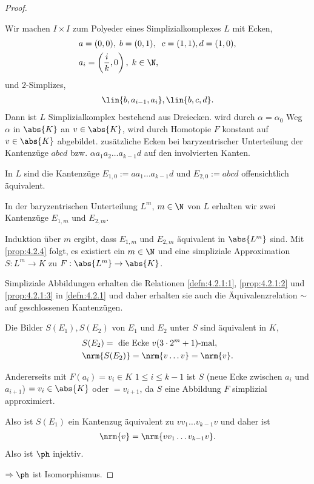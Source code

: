 \begin{proof}
\begin{enumerate}[label=\arabic{*}.)]
Wir machen $I\times I$ zum Polyeder eines Simplizialkomplexes $L$ mit Ecken,
\begin{align*}
&a = (0,0),\; b=(0,1),\;\; c=(1,1), d=(1,0),\\
&a_i = \left(\frac{i}{k},0\right),\; k\in\N,
\end{align*}
und $2$-Simplizes,
\begin{align*}
\lin{b,a_{i-1},a_i}, \lin{b,c,d}.
\end{align*}
Dann ist $L$ Simplizialkomplex bestehend aus Dreiecken.
wird durch $\alpha=\alpha_0$ Weg $\alpha$ in $\abs{K}$ an $v\in\abs{K}$,
wird durch Homotopie $F$ konstant auf $v\in\abs{K}$ abgebildet.
zusätzliche Ecken bei baryzentrischer Unterteilung der Kantenzüge $abcd$ bzw.
$\alpha a_1 a_2 \ldots a_{k-1} d$ auf den involvierten Kanten.

In $L$ sind die Kantenzüge $E_{1,0} := a a_1 \ldots a_{k-1}d$ und
$E_{2,0}:=abcd$ offensichtlich äquivalent.

In der baryzentrischen Unterteilung $L^m$, $m\in\N$ von $L$ erhalten wir zwei
Kantenzüge $E_{1,m}$ und $E_{2,m}$.

Induktion über $m$ ergibt, dass $E_{1,m}$ und $E_{2,m}$ äquivalent in
$\abs{L^m}$ sind. Mit \ref{prop:4.2.4} folgt, es existiert ein $m\in\N$ und eine simpliziale
Approximation $S: L^m\to K$ zu $F: \abs{L^m}\to\abs{K}$.

\begin{bemn}
Simpliziale Abbildungen erhalten die Relationen \ref{defn:4.2.1:1},
\ref{prop:4.2.1:2} und \ref{prop:4.2.1:3} in \ref{defn:4.2.1} und daher
erhalten sie auch die Äquivalenzrelation $\sim$ auf geschlossenen Kantenzügen.
\end{bemn}
\begin{bemn}[Also:]
Die Bilder $S(E_1),S(E_2)$ von $E_1$ und $E_2$ unter $S$ sind äquivalent in
$K$,
\begin{align*}
&S(E_2) = \text{ die Ecke } v (3\cdot 2^m + 1)\text{-mal},\\
&\nrm{S(E_2)} = \nrm{v\ldots v} = \nrm{v}.
\end{align*}
\end{bemn}
Andererseits mit $F(a_i) = v_i\in K$ $1\le i\le k-1$ ist $S$ (neue Ecke
zwischen $a_i$ und $a_{i+1}$) $=v_i\in\abs{K}$ oder $=v_{i+1}$, da $S$ eine
Abbildung $F$ simplizial approximiert.

Also ist $S(E_1)$ ein Kantenzug äquivalent zu $vv_1\ldots v_{k-1}v$ und daher
ist
\begin{align*}
\nrm{v} = \nrm{vv_1\ldots v_{k-1}v}.
\end{align*}
Also ist $\ph$ injektiv.
\end{enumerate}
$\Rightarrow \ph$ ist Isomorphismus.\qedhere
\end{proof}

